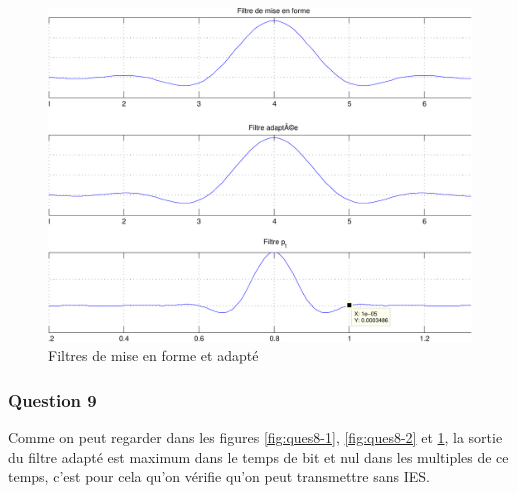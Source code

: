 \documentclass[a4paper,11pt]{article}
\begin{document}
\begin{figure}
	\begin{center}
	\includegraphics[scale=0.5]{Q8-3-crop.pdf}
	\caption{Filtres de mise en forme et adapté}
	\label{fig:ques8-3}
	\end{center}
\end{figure} 


\subsubsection*{Question 9}
Comme on peut regarder dans les figures \ref{fig:ques8-1}, \ref{fig:ques8-2} et \ref{fig:ques8-3}, la sortie du filtre adapté est maximum dans le temps de bit et nul dans les multiples de ce temps, c'est pour cela qu'on vérifie qu'on peut transmettre sans IES.
\end{document}

